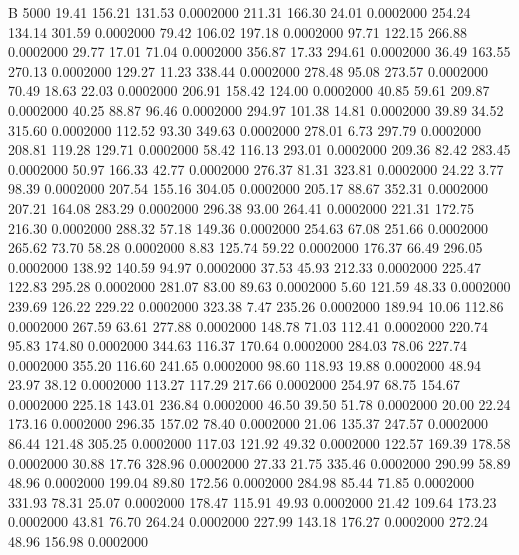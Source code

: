 


B 5000
  19.41  156.21  131.53   0.0002000
 211.31  166.30   24.01   0.0002000
 254.24  134.14  301.59   0.0002000
  79.42  106.02  197.18   0.0002000
  97.71  122.15  266.88   0.0002000
  29.77   17.01   71.04   0.0002000
 356.87   17.33  294.61   0.0002000
  36.49  163.55  270.13   0.0002000
 129.27   11.23  338.44   0.0002000
 278.48   95.08  273.57   0.0002000
  70.49   18.63   22.03   0.0002000
 206.91  158.42  124.00   0.0002000
  40.85   59.61  209.87   0.0002000
  40.25   88.87   96.46   0.0002000
 294.97  101.38   14.81   0.0002000
  39.89   34.52  315.60   0.0002000
 112.52   93.30  349.63   0.0002000
 278.01    6.73  297.79   0.0002000
 208.81  119.28  129.71   0.0002000
  58.42  116.13  293.01   0.0002000
 209.36   82.42  283.45   0.0002000
  50.97  166.33   42.77   0.0002000
 276.37   81.31  323.81   0.0002000
  24.22    3.77   98.39   0.0002000
 207.54  155.16  304.05   0.0002000
 205.17   88.67  352.31   0.0002000
 207.21  164.08  283.29   0.0002000
 296.38   93.00  264.41   0.0002000
 221.31  172.75  216.30   0.0002000
 288.32   57.18  149.36   0.0002000
 254.63   67.08  251.66   0.0002000
 265.62   73.70   58.28   0.0002000
   8.83  125.74   59.22   0.0002000
 176.37   66.49  296.05   0.0002000
 138.92  140.59   94.97   0.0002000
  37.53   45.93  212.33   0.0002000
 225.47  122.83  295.28   0.0002000
 281.07   83.00   89.63   0.0002000
   5.60  121.59   48.33   0.0002000
 239.69  126.22  229.22   0.0002000
 323.38    7.47  235.26   0.0002000
 189.94   10.06  112.86   0.0002000
 267.59   63.61  277.88   0.0002000
 148.78   71.03  112.41   0.0002000
 220.74   95.83  174.80   0.0002000
 344.63  116.37  170.64   0.0002000
 284.03   78.06  227.74   0.0002000
 355.20  116.60  241.65   0.0002000
  98.60  118.93   19.88   0.0002000
  48.94   23.97   38.12   0.0002000
 113.27  117.29  217.66   0.0002000
 254.97   68.75  154.67   0.0002000
 225.18  143.01  236.84   0.0002000
  46.50   39.50   51.78   0.0002000
  20.00   22.24  173.16   0.0002000
 296.35  157.02   78.40   0.0002000
  21.06  135.37  247.57   0.0002000
  86.44  121.48  305.25   0.0002000
 117.03  121.92   49.32   0.0002000
 122.57  169.39  178.58   0.0002000
  30.88   17.76  328.96   0.0002000
  27.33   21.75  335.46   0.0002000
 290.99   58.89   48.96   0.0002000
 199.04   89.80  172.56   0.0002000
 284.98   85.44   71.85   0.0002000
 331.93   78.31   25.07   0.0002000
 178.47  115.91   49.93   0.0002000
  21.42  109.64  173.23   0.0002000
  43.81   76.70  264.24   0.0002000
 227.99  143.18  176.27   0.0002000
 272.24   48.96  156.98   0.0002000
